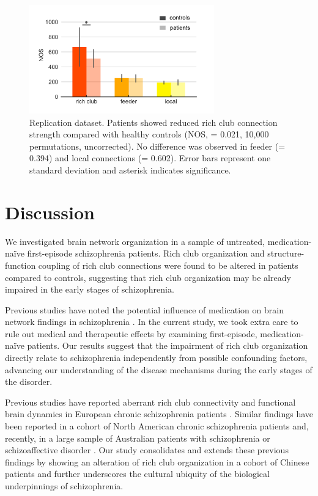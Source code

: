 \begin{refsection}
\begin{figure}[h]
\centering
  \includegraphics[width=8cm]{images/rcsczFig4.png}
  \caption{Replication dataset. Patients showed reduced rich club connection strength compared with healthy controls (NOS, \pval = 0.021, 10,000 permutations, uncorrected). No difference was observed in feeder (\pval = 0.394) and local connections (\pval = 0.602). Error bars represent one standard deviation and asterisk indicates significance.}
  \label{rcsczFig4}
\end{figure}


\section*{Discussion}
We investigated brain network organization in a sample of untreated, medication-na\"{i}ve first-episode schizophrenia patients. Rich club organization and structure-function coupling of rich club connections were found to be altered in patients compared to controls, suggesting that rich club organization may be already impaired in the early stages of schizophrenia.

Previous studies have noted the potential influence of medication on brain network findings in schizophrenia \citep{Crossley2017ConnectomicCO}. In the current study, we took extra care to rule out medical and therapeutic effects by examining first-episode, medication-na\"{i}ve patients. Our results suggest that the impairment of rich club organization directly relate to schizophrenia independently from possible confounding factors, advancing our understanding of the disease mechanisms during the early stages of the disorder.

Previous studies have reported aberrant rich club connectivity and functional brain dynamics in European chronic schizophrenia patients \citep{vanDenHeuvel2013AbnormalRC}. Similar findings have been reported in a cohort of North American chronic schizophrenia patients \citep{Yeo2016GraphMO} and, recently, in a large sample of Australian patients with schizophrenia or schizoaffective disorder \citep{Klauser2017WhiteMD}. Our study consolidates and extends these previous findings by showing an alteration of rich club organization in a cohort of Chinese patients and further underscores the cultural ubiquity of the biological underpinnings of schizophrenia.


\end{refsection}
